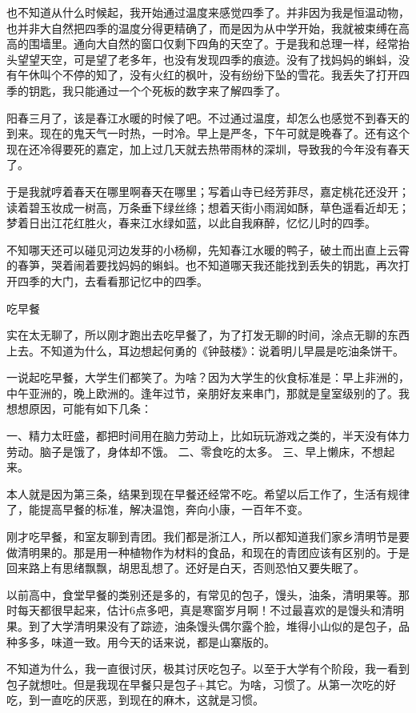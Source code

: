 也不知道从什么时候起，我开始通过温度来感觉四季了。并非因为我是恒温动物，也并非大自然把四季的温度分得更精确了，而是因为从中学开始，我就被束缚在高高的围墙里。通向大自然的窗口仅剩下四角的天空了。于是我和总理一样，经常抬头望望天空，可是望了老多年，也没有发现四季的痕迹。没有了找妈妈的蝌蚪，没有午休叫个不停的知了，没有火红的枫叶，没有纷纷下坠的雪花。我丢失了打开四季的钥匙，我只能通过一个个死板的数字来了解四季了。

阳春三月了，该是春江水暖的时候了吧。不过通过温度，却怎么也感觉不到春天的到来。现在的鬼天气一时热，一时冷。早上是严冬，下午可就是晚春了。还有这个现在还冷得要死的嘉定，加上过几天就去热带雨林的深圳，导致我的今年没有春天了。

于是我就哼着春天在哪里啊春天在哪里；写着山寺已经芳菲尽，嘉定桃花还没开；读着碧玉妆成一树高，万条垂下绿丝绦；想着天街小雨润如酥，草色遥看近却无；梦着日出江花红胜火，春来江水绿如蓝，以此自我麻醉，忆忆儿时的四季。

不知哪天还可以碰见河边发芽的小杨柳，先知春江水暖的鸭子，破土而出直上云霄的春笋，哭着闹着要找妈妈的蝌蚪。也不知道哪天我还能找到丢失的钥匙，再次打开四季的大门，去看看那记忆中的四季。


吃早餐

实在太无聊了，所以刚才跑出去吃早餐了，为了打发无聊的时间，涂点无聊的东西上去。不知道为什么，耳边想起何勇的《钟鼓楼》：说着明儿早晨是吃油条饼干。

一说起吃早餐，大学生们都笑了。为啥？因为大学生的伙食标准是：早上非洲的，中午亚洲的，晚上欧洲的。逢年过节，亲朋好友来串门，那就是皇室级别的了。我想想原因，可能有如下几条：

一、精力太旺盛，都把时间用在脑力劳动上，比如玩玩游戏之类的，半天没有体力劳动。脑子是饿了，身体却不饿。
二、零食吃的太多。
三、早上懒床，不想起来。

本人就是因为第三条，结果到现在早餐还经常不吃。希望以后工作了，生活有规律了，能提高早餐的标准，解决温饱，奔向小康，一百年不变。

刚才吃早餐，和室友聊到青团。我们都是浙江人，所以都知道我们家乡清明节是要做清明果的。那是用一种植物作为材料的食品，和现在的青团应该有区别的。于是回来路上有思绪飘飘，胡思乱想了。还好是白天，否则恐怕又要失眠了。

以前高中，食堂早餐的类别还是多的，有常见的包子，馒头，油条，清明果等。那时每天都很早起来，估计6点多吧，真是寒窗岁月啊！不过最喜欢的是馒头和清明果。到了大学清明果没有了踪迹，油条馒头偶尔露个脸，堆得小山似的是包子，品种多多，味道一致。用今天的话来说，都是山寨版的。

不知道为什么，我一直很讨厌，极其讨厌吃包子。以至于大学有个阶段，我一看到包子就想吐。但是我现在早餐只是包子+其它。为啥，习惯了。从第一次吃的好吃，到一直吃的厌恶，到现在的麻木，这就是习惯。

